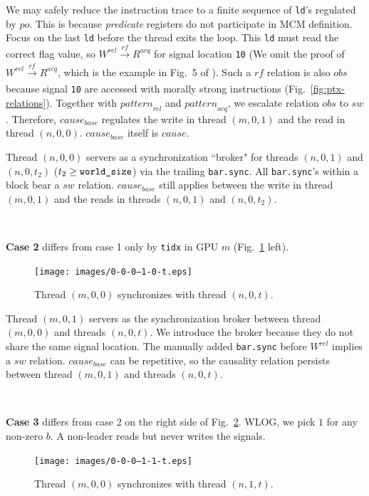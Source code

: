 \documentclass[acmsmall]{acmart}
\begin{document}
We may safely reduce the instruction trace to a finite sequence of \texttt{ld}'s regulated by $po$. This is because \textit{predicate} registers do not participate in MCM definition. Focus on the last \verb|ld| before the thread exits the loop. This \verb|ld| must read the correct flag value, so $W^{rel} \xrightarrow[]{rf} R^{acq}$ for signal location \verb|10| (We omit the proof of $W^{rel} \xrightarrow[]{rf} R^{acq}$, which is the example in Fig.~5 of \cite{ptx-mcm}). Such a $rf$ relation is also $obs$ because signal \verb|10| are accessed with morally strong instructions (Fig.~\ref{fig:ptx-relations}). Together with ${pattern}_{rel}$ and ${pattern}_{acq}$, we escalate relation $obs$ to $sw$. Therefore, ${cause}_{base}$ regulates the write in thread $(m,0,1)$ and the read in thread $(n,0,0)$. ${cause}_{base}$ itself is $cause$.

Thread $(n,0,0)$ servers as a synchronization ``broker" for threads $(n,0,1)$ and $(n,0,t_2)$ ($t_2 \geq \verb|world_size|$) via the trailing \verb|bar.sync|. All \verb|bar.sync|'s within a block bear a $sw$ relation. ${cause}_{base}$ still applies between the write in thread $(m,0,1)$ and the reads in threads $(n,0,1)$ and $(n,0,t_2)$.

\textcolor{white}{delimiter}

\noindent\textbf{Case 2} differs from case 1 only by \verb|tidx| in GPU $m$ (Fig.~\ref{fig:0-0-0—1-0-t} left).

\begin{figure}[H]
    \centering
    \texttt{[image: images/0-0-0—1-0-t.eps]}
    \caption{Thread $(m, 0, 0)$ synchronizes with thread $(n, 0, t)$.}
    \label{fig:0-0-0—1-0-t}
\end{figure}

Thread $(m,0,1)$ servers as the synchronization broker between thread $(m,0,0)$ and threads $(n,0,t)$. We introduce the broker because they do not share the same signal location. The manually added \verb|bar.sync| before $W^{rel}$ implies a $sw$ relation. ${cause}_{base}$ can be repetitive, so the causality relation persists between thread $(m,0,1)$ and threads $(n,0,t)$.

\textcolor{white}{delimiter}

\noindent\textbf{Case 3} differs from case 2 on the right side of Fig.~\ref{fig:0-0-0—1-1-t}. WLOG, we pick $1$ for any non-zero $b$. A non-leader reads but never writes the signals.

\begin{figure}[H]
    \centering
    \texttt{[image: images/0-0-0—1-1-t.eps]}
    \caption{Thread $(m, 0, 0)$ synchronizes with thread $(n, 1, t)$.}
    \label{fig:0-0-0—1-1-t}
\end{figure}
\end{document}
